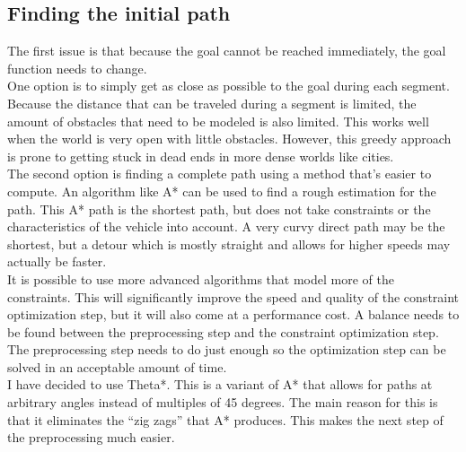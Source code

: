 \documentclass[12pt]{article}
\begin{document}
\subsection{Finding the initial path}
The first issue is that because the goal cannot be reached immediately, the goal function needs to change.  \\
One option is to simply get as close as possible to the goal during each segment. Because the distance that can be traveled during a segment is limited, the amount of obstacles that need to be modeled is also limited. This works well when the world is very open with little obstacles. However, this greedy approach is prone to getting stuck in dead ends in more dense worlds like cities.
\\
The second option is finding a complete path using a method that's easier to compute. An algorithm like A* can be used to find a rough estimation for the path. This A* path is the shortest path, but does not take constraints or the characteristics of the vehicle into account. A very curvy direct path may be the shortest, but a detour which is mostly straight and allows for higher speeds may actually be faster. 
\\
It is possible to use more advanced algorithms that model more of the constraints. This will significantly improve the speed and quality of the constraint optimization step, but it will also come at a performance cost. A balance needs to be found between the preprocessing step and the constraint optimization step. The preprocessing step needs to do just enough so the optimization step can be solved in an acceptable amount of time. 
\\
I have decided to use Theta*. This is a variant  of A* that allows for paths at arbitrary angles instead of multiples of 45 degrees. The main reason for this is that it eliminates the ``zig zags'' that A* produces. This makes the next step of the preprocessing much easier.\\
\end{document}
